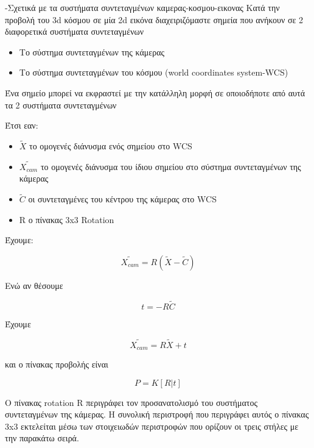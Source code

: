 



-Σχετικά με τα συστήματα συντεταγμένων καμερας-κοσμου-εικονας
Κατά την προβολή του 3d κόσμου σε μία 2d εικόνα διαχειριζόμαστε σημεία που ανήκουν σε 2 διαφορετικά συστήματα συντεταγμένων

\begin{itemize}
\item Το σύστημα συντεταγμένων της κάμερας 
\item Το σύστημα συντεταγμένων του κόσμου (world coordinates system-WCS)
\end{itemize}


Ένα σημείο μπορεί να εκφραστεί με την κατάλληλη μορφή σε οποιοδήποτε από αυτά τα 2 συστήματα συντεταγμένων

Έτσι εαν:

\begin{itemize}
\item $\tilde{X}$ το ομογενές διάνυσμα ενός σημείου στο WCS
\item $\tilde{X_{cam}}$ το ομογενές διάνυσμα του ίδιου σημείου στο σύστημα συντεταγμένων της κάμερας
\item $\tilde{C}$ οι συντεταγμένες του κέντρου της κάμερας στο WCS
\item R ο πίνακας 3x3 Rotation
\end{itemize}

Έχουμε:

\begin{equation}
\tilde{X_{cam}}=R(\tilde{X}-\tilde{C})
\end{equation}

Ενώ αν θέσουμε 


\begin{equation}
t=-R\tilde{C}
\end{equation}


Έχουμε 

\begin{equation}
\tilde{X_{cam}}=R\tilde{X}+t
\end{equation}


και ο πίνακας προβολής είναι

\begin{equation}
P=K[R|t]
\end{equation}


Ο πίνακας rotation R περιγράφει τον προσανατολισμό του συστήματος συντεταγμένων της κάμερας. Η συνολική περιστροφή που περιγράφει αυτός ο πίνακας 3x3 εκτελείται μέσω των στοιχειωδών περιστροφών που ορίζουν οι τρεις στήλες με την παρακάτω σειρά.



